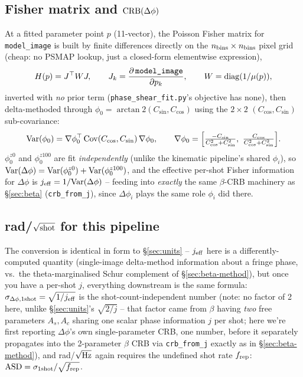 \documentclass[11pt,a4paper]{article}
\newcommand{\code}[1]{\texttt{#1}}
\begin{document}
\subsection{Fisher matrix and $\rm{CRB}(\Delta\phi)$}
\label{sec:ps-fisher}

At a fitted parameter point $p$ (11-vector), the Poisson Fisher matrix for
\code{model\_image} is built by finite differences directly on the
$n_{\rm bins}\times n_{\rm bins}$ pixel grid (cheap: no PSMAP lookup, just a
closed-form elementwise expression),
\[
  H(p) = J^\top W J,\qquad J_{k}=\frac{\partial\,\code{model\_image}}{\partial p_k},
  \qquad W={\rm diag}(1/\mu(p)),
\]
inverted with \emph{no} prior term (\code{phase\_shear\_fit.py}'s objective
has none), then delta-methoded through $\phi_0=\arctan2(C_{\sin},C_{\cos})$
using the $2\times2$ $(C_{\cos},C_{\sin})$ sub-covariance:
\[
  {\rm Var}(\phi_0) = \nabla\phi_0^\top\,{\rm Cov}(C_{\cos},C_{\sin})\,\nabla\phi_0,
  \qquad
  \nabla\phi_0 = \Big[\tfrac{-C_{\sin}}{C_{\cos}^2+C_{\sin}^2},\ \tfrac{C_{\cos}}{C_{\cos}^2+C_{\sin}^2}\Big].
\]
$\phi_0^{z0}$ and $\phi_0^{z100}$ are fit \emph{independently} (unlike the
kinematic pipeline's shared $\phi_i$), so
${\rm Var}(\Delta\phi)={\rm Var}(\phi_0^{z0})+{\rm Var}(\phi_0^{z100})$, and
the effective per-shot Fisher information for $\Delta\phi$ is
$j_{\rm eff}=1/{\rm Var}(\Delta\phi)$ -- feeding into \emph{exactly} the
same $\beta$-CRB machinery as \S\ref{sec:beta} (\code{crb\_from\_j}), since
$\Delta\phi_i$ plays the same role $\phi_i$ did there.

\subsection{rad/$\sqrt{\rm shot}$ for this pipeline}
\label{sec:ps-units}

The conversion is identical in form to \S\ref{sec:units} -- $j_{\rm eff}$
here is a differently-computed quantity (single-image delta-method
information about a fringe phase, vs.\ the theta-marginalised Schur
complement of \S\ref{sec:beta-method}), but once you have a per-shot $j$,
everything downstream is the same formula:
$\sigma_{\Delta\phi,\rm 1shot}=\sqrt{1/j_{\rm eff}}$ is the shot-count-independent
number (note: no factor of 2 here, unlike \S\ref{sec:units}'s
$\sqrt{2/j}$ -- that factor came from $\beta$ having \emph{two} free
parameters $A_s,A_c$ sharing one scalar phase information $j$ per shot;
here we're first reporting $\Delta\phi$'s own single-parameter CRB, one
number, before it separately propagates into the 2-parameter $\beta$ CRB
via \code{crb\_from\_j} exactly as in \S\ref{sec:beta-method}), and
rad/$\sqrt{\rm Hz}$ again requires the undefined shot rate $f_{\rm rep}$:
${\rm ASD}=\sigma_{\rm 1shot}/\sqrt{f_{\rm rep}}$.
\end{document}
